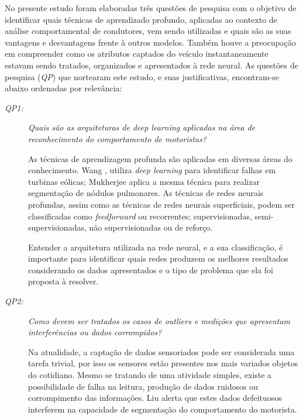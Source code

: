 \documentclass[10pt,journal,compsoc]{IEEEtran}
\begin{document}
No presente estudo foram elaboradas três questões de pesquisa com o
objetivo de identificar quais técnicas de aprendizado profundo,
aplicadas ao contexto de análise comportamental de condutores, vem
sendo utilizadas e quais são as suas vantagens e desvantagens frente à
outros modelos. Também houve a preocupação em compreender como os
atributos captados do veículo instantaneamente estavam sendo tratados,
organizados e apresentados à rede neural. As questões de pesquisa
(\emph{QP}) que nortearam este estudo, e suas justificativas,
encontram-se abaixo ordenadas por relevância:

\begin{description}
\item [\emph{QP1: }]\emph{Quais são as arquiteturas de \textit{deep learning} aplicadas
  na área de reconhecimento do comportamento de motoristas?}
  \vspace{0.15cm}
  \begin{adjustwidth}{}{}
    As técnicas de aprendizagem profunda são aplicadas em diversas
    áreas do conhecimento. Wang \cite{Wang20171360},  utiliza
    \textit{deep learning} para identificar falhas em turbinas
    eólicas; Mukherjee \cite{Mukherjee20171205} aplica a mesma técnica para realizar
    segmentação de nódulos pulmonares. As técnicas de redes neurais profundas,
    assim como as técnicas de redes neurais superficiais, podem ser classificadas
    como \textit{feedforward} ou recorrentes; supervisionadas, semi-supervisionadas, não
    supervisionadas ou de reforço.

    Entender a arquitetura utilizada na rede neural, e a sua
    classificação, é importante para identificar quais redes produzem
    os melhores resultados considerando os dados apresentados e o
    tipo de problema que ela foi proposta à resolver.
  \end{adjustwidth}
  \vspace{0.3cm}
\item [\emph{QP2: }]\emph{Como devem ser tratados os casos de \textit{outliers} e
  medições que apresentam interferências ou dados corrompidos?}
  \vspace{0.15cm}
  \begin{adjustwidth}{}{}
    Na atualidade, a captação de dados sensoriados pode ser
    considerada uma tarefa trivial, por isso os sensores estão presentes nos mais
    variados objetos do cotidiano. Mesmo se tratando de uma atividade
    simples, existe a possibilidade de falha na leitura, produção de dados
    ruidosos ou corrompimento das informações. Liu \cite{Liu2016}
    alerta que estes dados defeituosos interferem na
    capacidade de segmentação do comportamento do motorista.
    

\end{adjustwidth}
\end{description}
\end{document}
